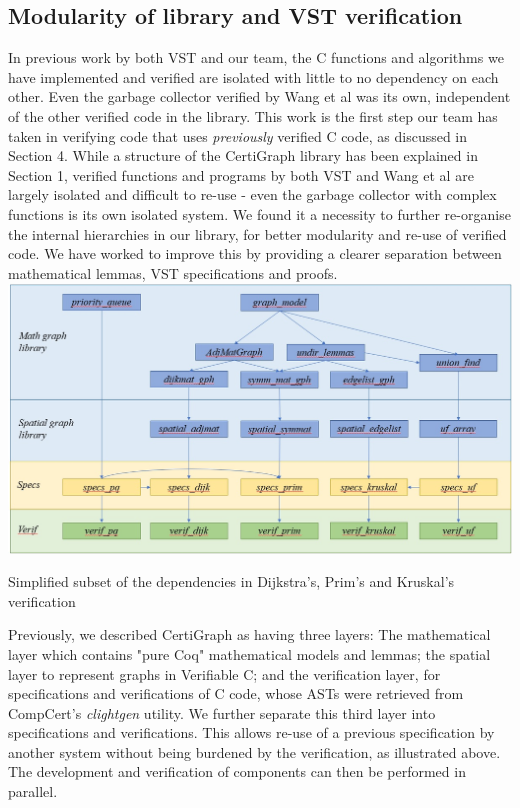 \subsection{Modularity of library and VST verification}
In previous work by both VST and our team, the C functions and algorithms we have implemented and verified are isolated with little to no dependency on each other. Even the garbage collector verified by Wang et al was its own, independent of the other verified code in the library. This work is the first step our team has taken in verifying code that uses \textit{previously} verified C code, as discussed in Section 4. While a structure of the CertiGraph library has been explained in Section 1, verified functions and programs by both VST and Wang et al are largely isolated and difficult to re-use - even the garbage collector with complex functions is its own isolated system. We found it a necessity to further re-organise the internal hierarchies in our library, for better modularity and re-use of verified code. We have worked to improve this by providing a clearer separation between mathematical lemmas, VST specifications and proofs.
\newline\newline
\includegraphics[scale=0.56]{structure.jpg}
\begin{center}Simplified subset of the dependencies in Dijkstra's, Prim's and Kruskal's verification
\end{center}
Previously, we described CertiGraph as having three layers: The mathematical layer which contains "pure Coq" mathematical models and lemmas; the spatial layer to represent graphs in Verifiable C; and the verification layer, for specifications and verifications of C code, whose ASTs were retrieved from CompCert's \textit{clightgen} utility. We further separate this third layer into specifications and verifications. This allows re-use of a previous specification by another system without being burdened by the verification, as illustrated above. The development and verification of components can then be performed in parallel.
